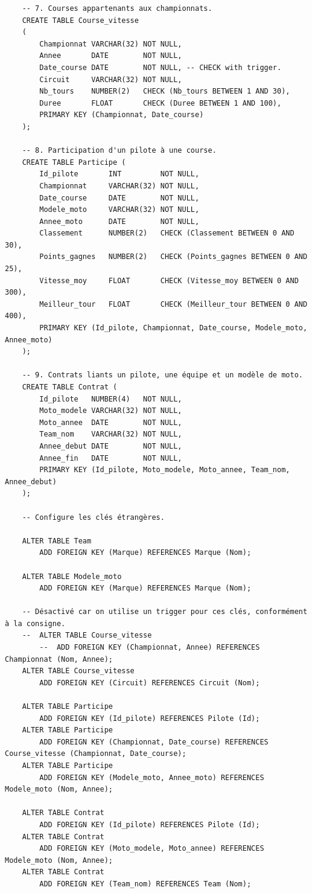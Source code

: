 \documentclass[12pt,a4paper]{article}
\newenvironment{code}{\captionsetup{type=listing}}{}
\begin{document}
\begin{code}
\begin{verbatim}
    -- 7. Courses appartenants aux championnats.
    CREATE TABLE Course_vitesse
    (
        Championnat VARCHAR(32) NOT NULL,
        Annee       DATE        NOT NULL,
        Date_course DATE        NOT NULL, -- CHECK with trigger.
        Circuit     VARCHAR(32) NOT NULL,
        Nb_tours    NUMBER(2)   CHECK (Nb_tours BETWEEN 1 AND 30),
        Duree       FLOAT       CHECK (Duree BETWEEN 1 AND 100),
        PRIMARY KEY (Championnat, Date_course)
    );

    -- 8. Participation d'un pilote à une course.
    CREATE TABLE Participe (
        Id_pilote       INT         NOT NULL,
        Championnat     VARCHAR(32) NOT NULL,
        Date_course     DATE        NOT NULL,
        Modele_moto     VARCHAR(32) NOT NULL,
        Annee_moto      DATE        NOT NULL,
        Classement      NUMBER(2)   CHECK (Classement BETWEEN 0 AND 30),
        Points_gagnes   NUMBER(2)   CHECK (Points_gagnes BETWEEN 0 AND 25),
        Vitesse_moy     FLOAT       CHECK (Vitesse_moy BETWEEN 0 AND 300),
        Meilleur_tour   FLOAT       CHECK (Meilleur_tour BETWEEN 0 AND 400),
        PRIMARY KEY (Id_pilote, Championnat, Date_course, Modele_moto, Annee_moto)
    );

    -- 9. Contrats liants un pilote, une équipe et un modèle de moto.
    CREATE TABLE Contrat (
        Id_pilote   NUMBER(4)   NOT NULL,
        Moto_modele VARCHAR(32) NOT NULL,
        Moto_annee  DATE        NOT NULL,
        Team_nom    VARCHAR(32) NOT NULL,
        Annee_debut DATE        NOT NULL,
        Annee_fin   DATE        NOT NULL,
        PRIMARY KEY (Id_pilote, Moto_modele, Moto_annee, Team_nom, Annee_debut)
    );

    -- Configure les clés étrangères.

    ALTER TABLE Team
        ADD FOREIGN KEY (Marque) REFERENCES Marque (Nom);

    ALTER TABLE Modele_moto
        ADD FOREIGN KEY (Marque) REFERENCES Marque (Nom);

    -- Désactivé car on utilise un trigger pour ces clés, conformément à la consigne.
    --  ALTER TABLE Course_vitesse
        --  ADD FOREIGN KEY (Championnat, Annee) REFERENCES Championnat (Nom, Annee);
    ALTER TABLE Course_vitesse
        ADD FOREIGN KEY (Circuit) REFERENCES Circuit (Nom);

    ALTER TABLE Participe
        ADD FOREIGN KEY (Id_pilote) REFERENCES Pilote (Id);
    ALTER TABLE Participe
        ADD FOREIGN KEY (Championnat, Date_course) REFERENCES Course_vitesse (Championnat, Date_course);
    ALTER TABLE Participe
        ADD FOREIGN KEY (Modele_moto, Annee_moto) REFERENCES Modele_moto (Nom, Annee);

    ALTER TABLE Contrat
        ADD FOREIGN KEY (Id_pilote) REFERENCES Pilote (Id);
    ALTER TABLE Contrat
        ADD FOREIGN KEY (Moto_modele, Moto_annee) REFERENCES Modele_moto (Nom, Annee);
    ALTER TABLE Contrat
        ADD FOREIGN KEY (Team_nom) REFERENCES Team (Nom);
    \end{verbatim}
    \caption{Code SQL permettant de mettre en place la base de données}
    \label{lst.create}
\end{code}
\end{document}
